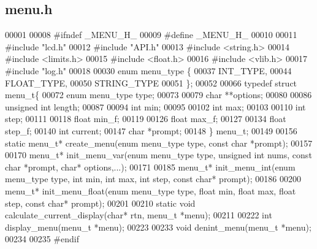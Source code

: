 \subsection{menu.\+h}
\label{menu_8h_source}

\begin{DoxyCode}
00001 
00008 \textcolor{preprocessor}{#ifndef \_MENU\_H\_}
00009 \textcolor{preprocessor}{#define \_MENU\_H\_}
00010 
00011 \textcolor{preprocessor}{#include "lcd.h"}
00012 \textcolor{preprocessor}{#include "API.h"}
00013 \textcolor{preprocessor}{#include <string.h>}
00014 \textcolor{preprocessor}{#include <limits.h>}
00015 \textcolor{preprocessor}{#include <float.h>}
00016 \textcolor{preprocessor}{#include <vlib.h>}
00017 \textcolor{preprocessor}{#include "log.h"}
00018 
00030 \textcolor{keyword}{enum} menu_type \{
00037   INT_TYPE,
00044   FLOAT_TYPE,
00050   STRING_TYPE
00051 \};
00052 
00066 \textcolor{keyword}{typedef} \textcolor{keyword}{struct }menu_t\{
00072   \textcolor{keyword}{enum} menu_type type;
00073 
00079   \textcolor{keywordtype}{char} **options;
00080 
00086   \textcolor{keywordtype}{unsigned} \textcolor{keywordtype}{int} length;
00087 
00094   \textcolor{keywordtype}{int} min;
00095 
00102   \textcolor{keywordtype}{int} max;
00103 
00110   \textcolor{keywordtype}{int} step;
00111 
00118   \textcolor{keywordtype}{float} min_f;
00119 
00126   \textcolor{keywordtype}{float} max_f;
00127 
00134   \textcolor{keywordtype}{float} step_f;
00140   \textcolor{keywordtype}{int} current;
00147   \textcolor{keywordtype}{char} *prompt;
00148 \} menu_t;
00149 
00156 \textcolor{keyword}{static} menu_t* create_menu(\textcolor{keyword}{enum} menu_type type, \textcolor{keyword}{const} \textcolor{keywordtype}{char} *prompt);
00157 
00170 menu_t* init_menu_var(\textcolor{keyword}{enum} menu_type type, \textcolor{keywordtype}{unsigned} \textcolor{keywordtype}{int} nums, \textcolor{keyword}{const} \textcolor{keywordtype}{char} *prompt, \textcolor{keywordtype}{char}* 
      options,...);
00171 
00185 menu_t* init_menu_int(\textcolor{keyword}{enum} menu_type type, \textcolor{keywordtype}{int} min, \textcolor{keywordtype}{int} max, \textcolor{keywordtype}{int} step, \textcolor{keyword}{const} \textcolor{keywordtype}{char}* 
      prompt);
00186 
00200 menu_t* init_menu_float(\textcolor{keyword}{enum} menu_type type, \textcolor{keywordtype}{float} min, \textcolor{keywordtype}{float} max, \textcolor{keywordtype}{float} step, \textcolor{keyword}{const} \textcolor{keywordtype}{char}* 
      prompt);
00201 
00210 \textcolor{keyword}{static} \textcolor{keywordtype}{void} calculate_current_display(\textcolor{keywordtype}{char}* rtn, menu_t *menu);
00211 
00222 \textcolor{keywordtype}{int} display_menu(menu_t *menu);
00223 
00233 \textcolor{keywordtype}{void} denint_menu(menu_t *menu);
00234 
00235 \textcolor{preprocessor}{#endif}
\end{DoxyCode}
